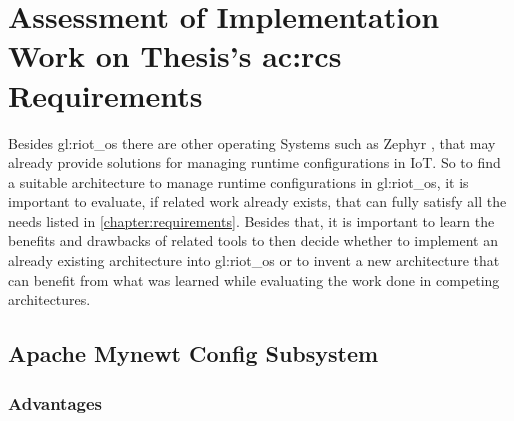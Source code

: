 \section{Assessment of Implementation Work on Thesis's \acrshort{ac:rcs} Requirements}
\label{sec:related_work:assessment_of_implementation_work_on_thesis_requirements}

Besides \gls{gl:riot_os} there are other operating Systems such as Zephyr \cite{zephyr-20}, that may already provide solutions for managing runtime configurations in IoT.
So to find a suitable architecture to manage runtime configurations in \gls{gl:riot_os}, it is important to evaluate, if related work already exists, that can fully satisfy all the needs listed in \autoref{chapter:requirements}.
Besides that, it is important to learn the benefits and drawbacks of related tools to then decide whether to implement an already existing architecture into \gls{gl:riot_os} or to invent a new architecture that can benefit from what was learned while evaluating the work done in competing architectures.

\subsection{Apache Mynewt Config Subsystem}
\label{sec:related_work:mynewt_config}

\subsubsection{Advantages}
\label{sec:related_work:mynewt_config_advantages}


